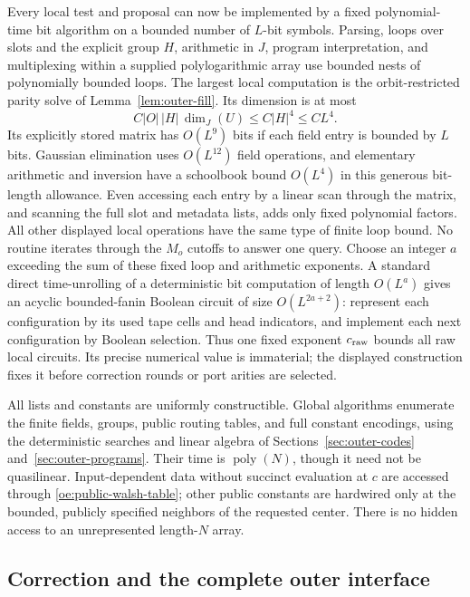 Every local test and proposal can now be implemented by a fixed
polynomial-time bit algorithm on a bounded number of $L$-bit symbols.
Parsing, loops over slots and the explicit group $H$, arithmetic in $J$,
program interpretation, and multiplexing within a supplied
polylogarithmic array use bounded nests of polynomially bounded loops.
The largest local computation is the orbit-restricted parity solve of
Lemma~\ref{lem:outer-fill}. Its dimension is at most
\[
 C|O|\,|H|\,\dim_J(U)\leq C|H|^4\leq CL^4.
\]
Its explicitly stored matrix has $O(L^9)$ bits if each field entry is
bounded by $L$ bits. Gaussian elimination uses $O(L^{12})$ field
operations, and elementary arithmetic and inversion have a schoolbook
bound $O(L^4)$ in this generous bit-length allowance. Even accessing
each entry by a linear scan through the matrix, and scanning the full
slot and metadata lists, adds only fixed polynomial factors. All other
displayed local operations have the same type of finite loop bound.
No routine iterates through the $M_o$ cutoffs to answer one query.
Choose an integer $a$ exceeding the sum of these fixed loop and
arithmetic exponents. A standard direct time-unrolling of a deterministic
bit computation of length $O(L^a)$ gives an acyclic bounded-fanin Boolean
circuit of size $O(L^{2a+2})$: represent each configuration by its used
tape cells and head indicators, and implement each next configuration
by Boolean selection. Thus one fixed exponent $c_{\rm raw}$ bounds all
raw local circuits. Its precise numerical value is immaterial; the
displayed construction fixes it before correction rounds or port arities
are selected.

All lists and constants are uniformly constructible. Global algorithms
enumerate the finite fields, groups, public routing tables, and full
constant encodings, using the deterministic searches and linear algebra
of Sections~\ref{sec:outer-codes} and~\ref{sec:outer-programs}. Their
time is $\operatorname{poly}(N)$, though it need not be quasilinear.
Input-dependent data without succinct evaluation at $c$ are accessed
through \eqref{oe:public-walsh-table}; other public constants are
hardwired only at the bounded, publicly specified neighbors of the
requested center. There is no hidden access to an unrepresented
length-$N$ array.

\subsection{Correction and the complete outer interface}

